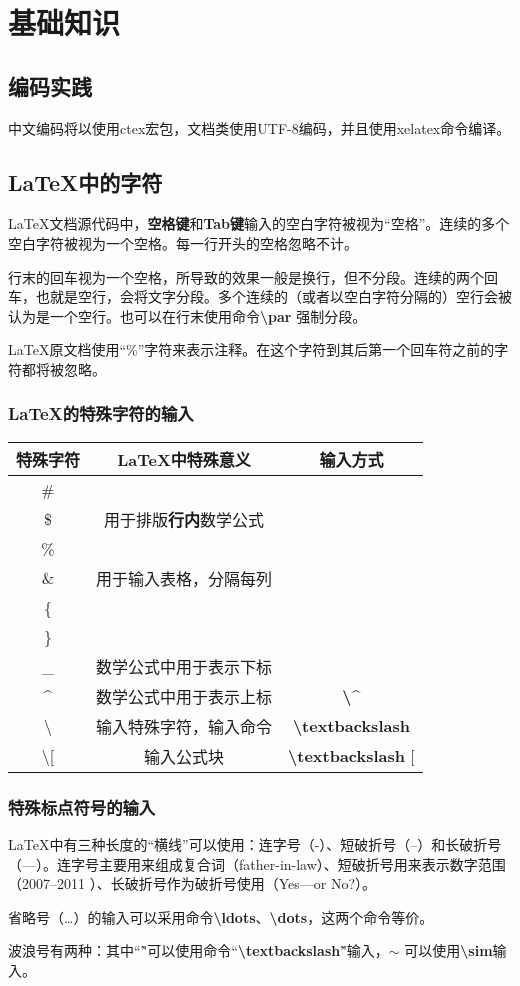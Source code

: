 \documentclass[utf8]{book}
\begin{document}
	
	\newcommand{\latexcommand}[1]{\textbf{\textbackslash #1}}
	
	\chapter{基础知识}
	\section{编码实践}
	中文编码将以使用ctex宏包，文档类使用UTF-8编码，并且使用xelatex命令编译。
	\section{\LaTeX 中的字符}
	\LaTeX 文档源代码中，\textbf{空格键}和\textbf{Tab键}输入的空白字符被视为“空格”。连续的多个空白字符被视为一个空格。每一行开头的空格忽略不计。
	
	行末的回车视为一个空格，所导致的效果一般是换行，但不分段。连续的两个回车，也就是空行，会将文字分段。多个连续的（或者以空白字符分隔的）空行会被认为是一个空行。也可以在行末使用命令\latexcommand{par} 强制分段。
	
	\LaTeX 原文档使用“\%”字符来表示注释。在这个字符到其后第一个回车符之前的字符都将被忽略。
	
	\subsection{\LaTeX 的特殊字符的输入}
	\begin{tabular}{|c|c|c|}
		\hline
		特殊字符 & \LaTeX 中特殊意义 & 输入方式 \\
		\hline
		\# &  & \\
		\hline
		\$ & 用于排版\textbf{行内}数学公式 & \\
		\hline
		\% & & \\
		\hline
		\& & 用于输入表格，分隔每列 & \\
		\hline
		\{ & & \\
		\hline
		\}& & \\
		\hline
		\_ & 数学公式中用于表示下标 &  \\
		\hline
		\^ & 数学公式中用于表示上标 & \latexcommand{\^} \\
		\hline
		\textbackslash  & 输入特殊字符，输入命令 & \latexcommand{textbackslash} \\
		\hline
		\textbackslash [  & 输入公式块 & \latexcommand{textbackslash} [ \\
		\hline
	\end{tabular}
	
	\subsection{特殊标点符号的输入}
		\LaTeX 中有三种长度的“横线”可以使用：连字号（-）、短破折号（--）和长破折号（---）。连字号主要用来组成复合词（father-in-law）、短破折号用来表示数字范围（2007--2011 ）、长破折号作为破折号使用（Yes---or No?）。
	
		省略号（\ldots）的输入可以采用命令\latexcommand{ldots}、\latexcommand{dots}，这两个命令等价。
	
		波浪号有两种：其中“\~ ”可以使用命令“\latexcommand{textbackslash}\~”输入，$ \sim $ 可以使用\latexcommand{sim}输入。
		

		
		
	
\end{document}
